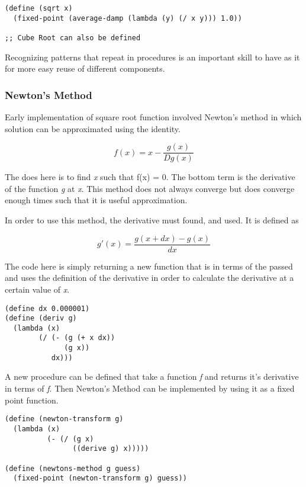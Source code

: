 \documentclass[11pt]{article}
\begin{document}
\begin{verbatim}
(define (sqrt x)
  (fixed-point (average-damp (lambda (y) (/ x y))) 1.0))

;; Cube Root can also be defined
\end{verbatim}

Recognizing patterns that repeat in procedures is an important skill to
have as it for more easy reuse of different components.

\subsubsection{Newton's Method}
\label{sec:org3343891}
Early implementation of square root function involved Newton's method in
which solution can be approximated using the identity.

\begin{equation}
f(x) = x - \frac{g(x)}{Dg(x)}
\end{equation}

The does here is to find \emph{x} such that f(x) = 0. The bottom term is the
derivative of the function \emph{g} at \emph{x}. This method does not always
converge but does converge enough times such that it is useful
approximation.

In order to use this method, the derivative must found, and used. It is
defined as

\begin{equation}
g'(x) = \frac{g(x + dx) - g(x)}{dx}
\end{equation}

The code here is simply returning a new function that is in terms of the
passed and uses the definition of the derivative in order to calculate
the derivative at a certain value of \emph{x}.

\begin{verbatim}
(define dx 0.000001)
(define (deriv g)
  (lambda (x) 
        (/ (- (g (+ x dx))
              (g x))
           dx)))
\end{verbatim}

A new procedure can be defined that take a function \emph{f} and returns it's
derivative in terms of \emph{f}. Then Newton's Method can be implemented by
using it as a fixed point function.

\begin{verbatim}
(define (newton-transform g)
  (lambda (x)
          (- (/ (g x)
                ((derive g) x)))))

(define (newtons-method g guess)
  (fixed-point (newton-transform g) guess))
\end{verbatim}
\end{document}
